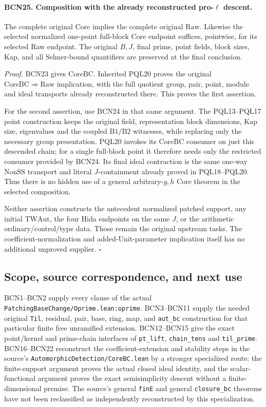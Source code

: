 \paragraph{BCN25. Composition with the already reconstructed pro-\(\ell\)
descent.}\label{claim:BCN25}
The complete original \(\mathrm{Core}\) implies the complete
original \(\mathrm{Raw}\).
Likewise the selected normalized one-point full-block
Core endpoint suffices, pointwise, for its selected Raw
endpoint.  The original \(B,J\), final prime, point fields,
block sizes, \(\mathrm{Kap}\), and all Selmer-bound
quantifiers are preserved at the final conclusion.

\emph{Proof.}
BCN23 gives \(\mathrm{CoreBC}\).
Inherited PQL20 proves the original
\(\mathrm{CoreBC}\Rightarrow\mathrm{Raw}\) implication,
with the full quotient group, pair, point, module and
ideal transports already reconstructed there.
This proves the first assertion.

For the second assertion, use BCN24 in that same
argument.  The PQL13--PQL17 point construction keeps
the original field, representation block dimensions,
\(\mathrm{Kap}\) size, eigenvalues and the coupled
\(\mathrm{B1}/\mathrm{B2}\) witnesses, while replacing
only the necessary group presentation.
PQL20 invokes its \(\mathrm{CoreBC}\) consumer on just
this descended chain; for a single full-block point it
therefore needs only the restricted consumer provided
by BCN24.  Its final ideal contraction is the same
one-way \(\mathrm{NonSS}\) transport and literal
\(J\)-containment already proved in PQL18--PQL20.
Thus there is no hidden use of a general arbitrary-\(g,h\)
Core theorem in the selected composition.

Neither assertion constructs the antecedent normalized
patched support, any initial \(\mathrm{TWAut}\), the four
Hida endpoints on the same \(J\), or the arithmetic
ordinary/control/type data.  Those remain the original
upstream tasks.  The coefficient-normalization and
added-Unit-parameter implication itself has no additional
unproved supplier.
\hfill\(\square\)

\subsection{Scope, source correspondence, and next use}

BCN1--BCN2 supply every clause of the actual
\texttt{PatchingBaseChange/Oprime.lean:oprime}.
BCN3--BCN11 supply the needed original
\texttt{Til}, residual, pair, base, ring, map, and
\texttt{aut\_bc} construction for that particular
finite free unramified extension.
BCN12--BCN15 give the exact point/kernel and prime-chain
interfaces of \texttt{pt\_lift}, \texttt{chain\_tens}
and \texttt{til\_prime}.
BCN16--BCN22 reconstruct the coefficient-extension and
stability steps in the source's
\texttt{AutomorphicDetection/\allowbreak{}CoreBC.lean} by a stronger
specialized route: the finite-support argument proves
the actual closed ideal identity, and the scalar-functional
argument proves the exact semisimplicity descent without
a finite-dimensional premise.
The source's general \texttt{finE} and general
\texttt{closure\_bc} theorems have not been reclassified
as independently reconstructed by this specialization.

